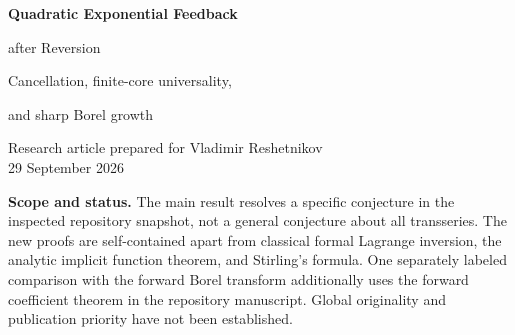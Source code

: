 \documentclass[11pt,a4paper]{article}
\numberwithin{equation}{section}
\theoremstyle{definition}
\theoremstyle{remark}
\newcommand{\Uhat}{\widehat U}\newcommand{\Vhat}{\widehat V}
\begin{document}
\begin{center}
{\LARGE\bfseries\color{ink} Quadratic Exponential Feedback\par after Reversion\par}
\vspace{0.7em}
{\large Cancellation, finite-core universality,\par and sharp Borel growth\par}
\vspace{1em}
Research article prepared for Vladimir Reshetnikov\\
29 September 2026
\end{center}

\begin{abstract}
Let $\Uhat(q)=\sum_{j\ge1}q^j\exp(a j^2\Uhat(q))$, where $a>0$, and
write $\Vhat=\Uhat^{\langle-1\rangle}=\sum v_nz^n$. We prove the quadratic
inverse equivalent proposed in the ProveIt finite-core feedback manuscript:
\[
 v_n\sim-S_n\exp\!\bigl(-(1+1/a)r_n\bigr),\qquad
 r_n(1+r_n)e^{2r_n}=an,
\]
where
\[
 S_n=\frac{\exp\!\left(\dfrac{nr_n}{1+r_n}(1+2r_n)\right)}
 {\sqrt{1+4r_n+2r_n^2}}.
\]
The missing cancellation estimate is supplied by inverting the defining
kernel first, grouping the resulting exact tree expansion by large actions,
and merging multiple large actions in a positive majorant. The argument is
not an absolute estimate on the powers in the reversion formula for
$\Uhat$ itself.

The result extends to every finite nonnegative perturbation of the weights
and slopes, and to eventually affine-quadratic slopes. Only
$\mu=\lambda_1+w_2$ from the finite core enters the leading inverse factor.
We also determine the leading relative error of every fixed core with at
least two actions: the first omitted nonzero action $\ell$ contributes
$w_\ell j_n t_n^{\ell-1}$, with
$j_n=n/(1+r_n)$ and $t_n=r_n(1+r_n)/(an)$.
A borderline slope perturbation $\kappa j/\log j$ changes the leading
constant by $e^{\kappa/(2a)}$.
Finally, the factorial-normalized inverse Borel transform is entire and has
a sharp double-exponential positive-ray equivalent, including its
prefactor. These are conventional mathematical proofs, accompanied by
reproducible exact finite checks; no Lean verification or literature-wide
priority claim is made.
\end{abstract}

\noindent\textbf{Scope and status.}
The main result resolves a specific conjecture in the inspected repository
snapshot, not a general conjecture about all transseries. The new proofs are
self-contained apart from classical formal Lagrange inversion, the analytic
implicit function theorem, and Stirling's formula. One separately labeled
comparison with the forward Borel transform additionally uses the forward
coefficient theorem in the repository manuscript. Global originality and
publication priority have not been established.
\end{document}

